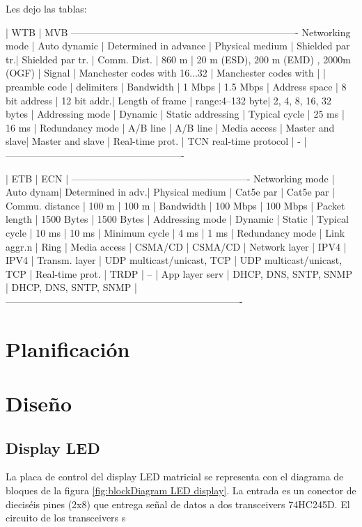 \documentclass[
11pt, %
]{charter}
\begin{document}
Les dejo las tablas:

| WTB | MVB
----------------------------------------------------------------------
Networking mode | Auto  dynamic | Determined in advance |
Physical medium | Shielded par tr.| Shielded par tr. |
Comm. Dist. | 860 m | 20 m (ESD), 200 m (EMD) , 2000m (OGF) |
Signal | Manchester codes with 16...32 | Manchester codes with |
| preamble code | delimiters |
Bandwidth | 1 Mbps | 1.5 Mbps |
Address space | 8 bit address | 12 bit addr.|
Length of frame | range:4–132 byte| 2, 4, 8, 16, 32 bytes |
Addressing mode | Dynamic | Static addressing |
Typical cycle | 25 ms | 16 ms |
Redundancy mode | A/B line | A/B line |
Media access | Master and slave| Master and slave |
Real-time prot. | TCN real-time protocol | - |
-------------------------------------------------------

| ETB | ECN |
-------------------------------------------------------
Networking mode | Auto  dynam| Determined in adv.|
Physical medium | Cat5e par   | Cat5e par  |
Commu. distance | 100 m | 100 m  |
Bandwidth | 100 Mbps | 100 Mbps  |
Packet length | 1500 Bytes | 1500 Bytes  |
Addressing mode | Dynamic | Static  |
Typical cycle | 10 ms | 10 ms |
Minimum cycle | 4 ms | 1 ms |
Redundancy mode | Link aggr.n | Ring |
Media access | CSMA/CD | CSMA/CD |
Network layer | IPV4 | IPV4 |
Transm. layer | UDP multicast/unicast, TCP | UDP multicast/unicast, TCP |
Real-time prot. | TRDP | – |
App layer serv | DHCP, DNS, SNTP, SNMP | DHCP, DNS, SNTP, SNMP |
-------------------------------------------------------------------------

\pagebreak

\section{Planificación}

\pagebreak

\section{Diseño}

\subsection{Display LED}
La placa de control del display LED matricial se representa con el diagrama de bloques de la figura \ref{fig:blockDiagram LED display}. La entrada es un conector de dieciséis pines (2x8) que entrega señal de datos a dos transceivers 74HC245D. El circuito de los transceivers s
\end{document}
